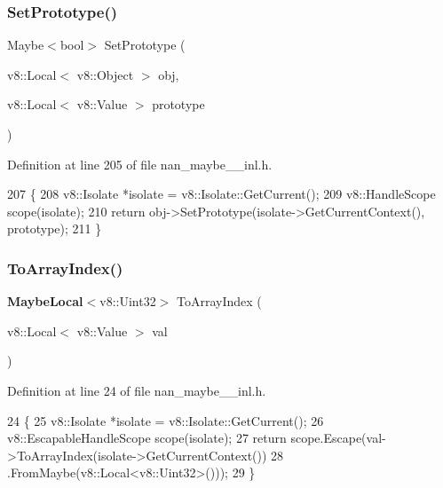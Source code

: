 \subsubsection{Set\+Prototype()}
{\footnotesize\ttfamily Maybe$<$bool$>$ Set\+Prototype (\begin{DoxyParamCaption}\item[{v8\+::\+Local$<$ v8\+::\+Object $>$}]{obj,  }\item[{v8\+::\+Local$<$ v8\+::\+Value $>$}]{prototype }\end{DoxyParamCaption})}



Definition at line 205 of file nan\+\_\+maybe\+\_\+\_\+inl.\+h.


\begin{DoxyCode}
207                                 \{
208   v8::Isolate *isolate = v8::Isolate::GetCurrent();
209   v8::HandleScope scope(isolate);
210   \textcolor{keywordflow}{return} obj->SetPrototype(isolate->GetCurrentContext(), prototype);
211 \}
\end{DoxyCode}
\mbox{\label{nan__maybe__43__inl_8h_a9d36f6fa6e874f5cc5c6c6747bdb88aa}} 
\subsubsection{To\+Array\+Index()}
{\footnotesize\ttfamily \textbf{ Maybe\+Local}$<$v8\+::\+Uint32$>$ To\+Array\+Index (\begin{DoxyParamCaption}\item[{v8\+::\+Local$<$ v8\+::\+Value $>$}]{val }\end{DoxyParamCaption})}



Definition at line 24 of file nan\+\_\+maybe\+\_\+\_\+inl.\+h.


\begin{DoxyCode}
24                                                         \{
25   v8::Isolate *isolate = v8::Isolate::GetCurrent();
26   v8::EscapableHandleScope scope(isolate);
27   \textcolor{keywordflow}{return} scope.Escape(val->ToArrayIndex(isolate->GetCurrentContext())
28                           .FromMaybe(v8::Local<v8::Uint32>()));
29 \}
\end{DoxyCode}
\mbox{\label{nan__maybe__43__inl_8h_a7e4b7f8e9e85a7d6192a1345d2fd48fb}} 
